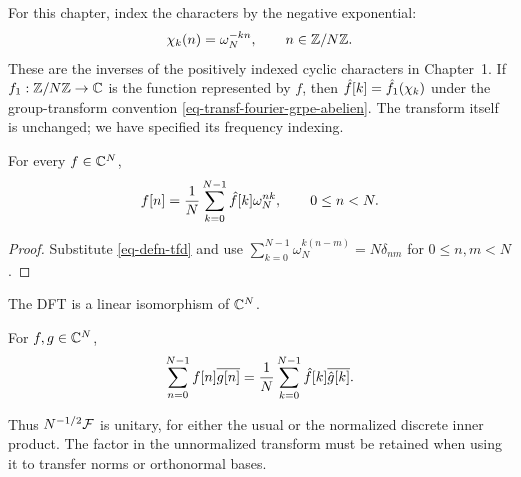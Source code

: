 
\begin{rem}
For this chapter, index the characters by the negative exponential:
\begin{equation}
\label{eq-formula-character-znz}
 \chi_k(n)=\omega_N^{-kn},\qquad n\in\mathbb{Z}/N\mathbb{Z}.
\end{equation}
These are the inverses of the positively indexed cyclic characters in
Chapter~1. If $f_1:\mathbb{Z}/N\mathbb{Z}\to\mathbb{C}$ is the function represented by $f$,
then $\hat{f}[k]=\hat{f_1}(\chi_k)$ under the group-transform convention
\eqref{eq-transf-fourier-grpe-abelien}. The transform itself is unchanged;
we have specified its frequency indexing.
\end{rem}


\begin{prop}[Inversion]
\label{prop-tfd-inverse}
For every $f\in\mathbb{C}^N$,
\begin{equation}
\label{eq-transforme-fourier-discr-inverse}
 f[n]=\frac1N\sum_{k=0}^{N-1}\hat{f}[k]\omega_N^{nk},\qquad 0\leq n<N.
\end{equation}
\end{prop}
\begin{proof}
Substitute \eqref{eq-defn-tfd} and use
$\sum_{k=0}^{N-1}\omega_N^{k(n-m)}=N\delta_{nm}$ for $0\leq n,m<N$.
\end{proof}


\begin{cor}
The DFT is a linear isomorphism of $\mathbb{C}^N$.
\end{cor}


\begin{prop}
\label{prop-formula-floorel-tfd}
For $f,g\in\mathbb{C}^N$,
\[
 \sum_{n=0}^{N-1}f[n]\overline{g[n]}
       =\frac1N\sum_{k=0}^{N-1}\hat{f}[k]\overline{\hat{g}[k]}.
\]
\end{prop}
Thus $N^{-1/2}\mathcal{F}$ is unitary, for either the usual or the normalized
discrete inner product. The factor in the unnormalized transform must be
retained when using it to transfer norms or orthonormal bases.

